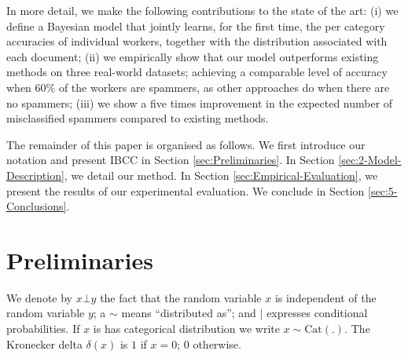 \documentclass{article}
\begin{document}
In more detail, we make the following contributions to the state
of the art: (i) we define a Bayesian model that jointly
learns, for the first time, the per category accuracies of individual
workers, together with the distribution associated
with each document; (ii) we empirically show that our model outperforms
existing methods on three real-world datasets; achieving
a comparable level of accuracy when 60\% of the workers
are spammers, as other approaches do when there are no spammers;
 (iii) we show a five times improvement in the expected number
of misclassified spammers compared to existing methods.



The remainder of this paper is organised as follows. We first introduce
our notation and present IBCC in Section \ref{sec:Preliminaries}.
In Section \ref{sec:2-Model-Description}, we detail our method.
In Section \ref{sec:Empirical-Evaluation}, we present the results
of our experimental evaluation. We conclude in Section \ref{sec:5-Conclusions}.


\section{Preliminaries\label{sec:Preliminaries}}

We denote by $x\bot y$ the fact that the random variable $x$ is
independent of the random variable $y$; a $\sim$ means ``distributed
as''; and $|$ expresses conditional probabilities. If $x$ is has
categorical distribution we write $x\sim\mbox{Cat}\left(.\right)$.
The Kronecker delta $\delta\left(x\right)$ is $1$ if $x=0$;
$0$ otherwise.
\end{document}
